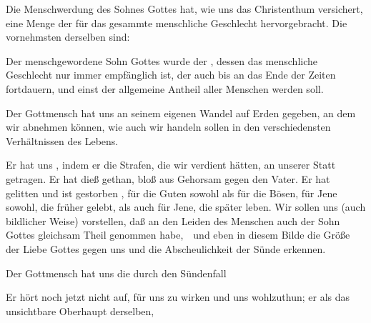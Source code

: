Die Menschwerdung des Sohnes Gottes hat, wie uns das Christenthum versichert, eine Menge der  für das gesammte menschliche Geschlecht hervorgebracht. Die vornehmsten derselben sind:
\begin{aufza}
\item Der menschgewordene Sohn Gottes wurde der , dessen das menschliche Geschlecht nur immer empfänglich ist, der auch bis an das Ende der Zeiten fortdauern, und einst der allgemeine Antheil aller Menschen werden soll.
\item Der Gottmensch hat uns an seinem eigenen Wandel auf Erden  gegeben, an dem wir abnehmen können, wie auch wir handeln sollen in den verschiedensten Verhältnissen des Lebens.
\item Er hat uns , indem er die Strafen, die wir verdient hätten, an unserer Statt getragen. Er hat dieß  gethan, bloß aus Gehorsam gegen den Vater. Er hat gelitten und ist gestorben , für die Guten sowohl als für die Bösen, für Jene sowohl, die früher gelebt, als auch für Jene, die später leben. Wir sollen uns (auch bildlicher Weise) vorstellen, daß an den Leiden des Menschen auch der Sohn Gottes gleichsam Theil genommen habe,~\ und eben in diesem Bilde die Größe der Liebe Gottes gegen uns und die Abscheulichkeit der Sünde erkennen.
\item Der Gottmensch hat uns die durch den Sündenfall 
\item Er hört noch jetzt nicht auf, für uns zu wirken und uns wohlzuthun; er  als das unsichtbare Oberhaupt derselben, \usw\
\end{aufza}

